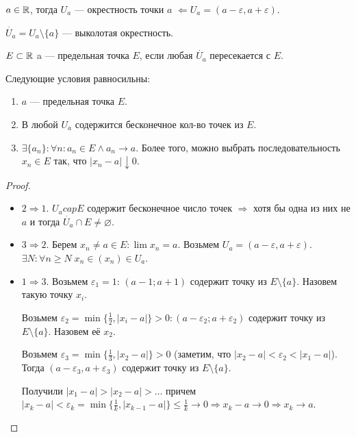 \begin{definition}
    $a \in \mathbb{R}$, тогда  $U_a$ --- окрестность точки  $a$  $\Leftarrow U_a = (a-\varepsilon, a + \varepsilon)$.
\end{definition}
\begin{definition}
    $\dot{U_a} = U_a \setminus \{a\}$ --- выколотая окрестность.
\end{definition}
\begin{definition}
    $E \subset \mathbb{R}$ a --- предельная точка  $E$, если любая  $\dot{U_a}$ пересекается с  $E$.
\end{definition}
\begin{theorem}
    Следующие условия равносильны:
    \begin{enumerate}
        \item $a$ --- предельная точка  $E$.
        \item В любой  $U_a$ содержится бесконечное кол-во точек из  $E$.
        \item  $\exists \{a_n\}: \forall n: a_n \in E \land a_n \to a$. Более того, можно выбрать последовательность  $x_n \in E$ так, что  $|x_n - a| \downarrow 0$.
    \end{enumerate}
\end{theorem}
\begin{proof}
    \slashn
    \begin{itemize}
        \item $2 \Rightarrow 1$. $U_a cap E$ содержит бесконечное число точек  $\Rightarrow$ хотя бы одна из них не  $a$ и тогда  $\dot{U_a} \cap E \neq \varnothing$.
        \item $3 \Rightarrow 2$. Берем  $x_n \neq a \in E: \lim x_n = a$. Возьмем  $U_a = (a-\varepsilon, a+\varepsilon)$.  $\exists N: \forall n \ge N\; x_n \in (x_n) \in U_a$.
        \item $1 \Rightarrow 3$. Возьмем $\varepsilon_1 = 1$:  $(a-1; a+1)$ содержит точку из $E \setminus \{a\}$. Назовем такую точку $x_i$.

            Возьмем  $\varepsilon_2 = \min\{\frac{1}{2}, |x_i - a|\} > 0: (a - \varepsilon_2; a + \varepsilon_2)$ содержит точку из $E \setminus \{a\}$. Назовем её  $x_2$.

            Возьмем  $\varepsilon_3 = \min\{\frac{1}{3}, |x_2 - a|\} > 0$ (заметим, что $|x_2 - a| < \varepsilon_2 < |x_1 - a|$). Тогда $(a-\varepsilon_3, a + \varepsilon_3)$ содержит точку из  $E \setminus \{a\}$.

            Получили  $|x_1-a| > |x_2 - a| > \ldots$ причем $|x_k - a| < \varepsilon_k = \min\{\frac{1}{k}, |x_{k-1} - a|\} \le \frac{1}{k} \to 0 \Rightarrow x_k - a \to 0 \Rightarrow x_k \to a$. 
    \end{itemize}
\end{proof}
